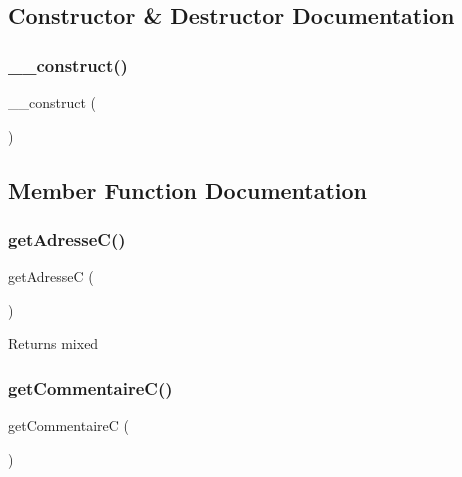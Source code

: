 \subsection{Constructor \& Destructor Documentation}
\mbox{\label{class_contact_a095c5d389db211932136b53f25f39685}} 
\subsubsection{\texorpdfstring{\+\_\+\+\_\+construct()}{\_\_construct()}}
{\footnotesize\ttfamily \+\_\+\+\_\+construct (\begin{DoxyParamCaption}{ }\end{DoxyParamCaption})}



\subsection{Member Function Documentation}
\mbox{\label{class_contact_a5a0f5742d37dc1cfa95c14eb399c859a}} 
\subsubsection{\texorpdfstring{get\+Adresse\+C()}{getAdresseC()}}
{\footnotesize\ttfamily get\+AdresseC (\begin{DoxyParamCaption}{ }\end{DoxyParamCaption})}

\begin{DoxyReturn}{Returns}
mixed 
\end{DoxyReturn}
\mbox{\label{class_contact_addef79c36bfeb21b1c04a5723c43d1e2}} 
\subsubsection{\texorpdfstring{get\+Commentaire\+C()}{getCommentaireC()}}
{\footnotesize\ttfamily get\+CommentaireC (\begin{DoxyParamCaption}{ }\end{DoxyParamCaption})}

